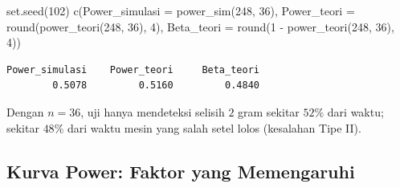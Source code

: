 \documentclass[
  indonesian,
  letterpaper,
]{book}
\newenvironment{Shaded}{\begin{snugshade}}{\end{snugshade}}
\newcommand{\AttributeTok}[1]{\textcolor[rgb]{0.40,0.45,0.13}{#1}}
\newcommand{\DecValTok}[1]{\textcolor[rgb]{0.68,0.00,0.00}{#1}}
\newcommand{\FunctionTok}[1]{\textcolor[rgb]{0.28,0.35,0.67}{#1}}
\newcommand{\NormalTok}[1]{\textcolor[rgb]{0.00,0.23,0.31}{#1}}
\newcommand{\SpecialCharTok}[1]{\textcolor[rgb]{0.37,0.37,0.37}{#1}}
\begin{document}
\begin{Shaded}
\begin{Highlighting}[]
\FunctionTok{set.seed}\NormalTok{(}\DecValTok{102}\NormalTok{)}
\FunctionTok{c}\NormalTok{(}\AttributeTok{Power\_simulasi =} \FunctionTok{power\_sim}\NormalTok{(}\DecValTok{248}\NormalTok{, }\DecValTok{36}\NormalTok{),}
  \AttributeTok{Power\_teori =} \FunctionTok{round}\NormalTok{(}\FunctionTok{power\_teori}\NormalTok{(}\DecValTok{248}\NormalTok{, }\DecValTok{36}\NormalTok{), }\DecValTok{4}\NormalTok{),}
  \AttributeTok{Beta\_teori =} \FunctionTok{round}\NormalTok{(}\DecValTok{1} \SpecialCharTok{{-}} \FunctionTok{power\_teori}\NormalTok{(}\DecValTok{248}\NormalTok{, }\DecValTok{36}\NormalTok{), }\DecValTok{4}\NormalTok{))}
\end{Highlighting}
\end{Shaded}

\begin{verbatim}
Power_simulasi    Power_teori     Beta_teori 
        0.5078         0.5160         0.4840 
\end{verbatim}

Dengan \(n = 36\), uji hanya mendeteksi selisih \(2\) gram sekitar
\(52\%\) dari waktu; sekitar \(48\%\) dari waktu mesin yang salah setel
lolos (kesalahan Tipe II).

\subsection{Kurva Power: Faktor yang
Memengaruhi}\label{kurva-power-faktor-yang-memengaruhi}
\end{document}
